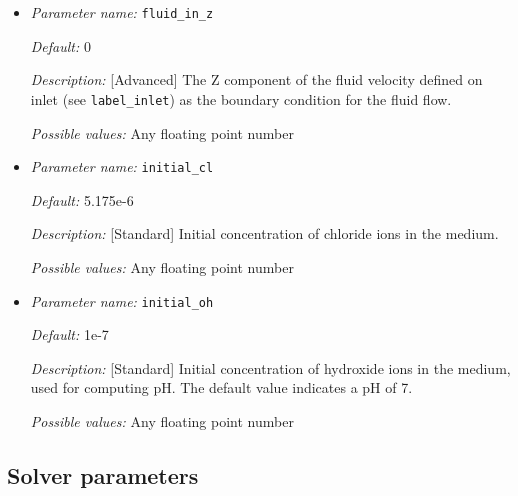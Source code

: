 \begin{itemize}

{\it Default:} 0

{\it Description:} [Advanced] The Y component of the fluid velocity defined on inlet (see {\tt label\_inlet}) as the boundary condition for the fluid flow.

{\it Possible values:} Any floating point number


\item {\it Parameter name:} {\tt fluid\_in\_z}
\label{parameters:fluid_in_z}


{\it Default:} 0

{\it Description:} [Advanced] The Z component of the fluid velocity defined on inlet (see {\tt label\_inlet}) as the boundary condition for the fluid flow.

{\it Possible values:} Any floating point number


\item {\it Parameter name:} {\tt initial\_cl}
\label{parameters:initial_cl}


{\it Default:} 5.175e-6

{\it Description:} [Standard] Initial concentration of chloride ions in the medium.

{\it Possible values:} Any floating point number


\item {\it Parameter name:} {\tt initial\_oh}
\label{parameters:initial_oh}


{\it Default:} 1e-7

{\it Description:} [Standard] Initial concentration of hydroxide ions in the medium, used for computing pH. The default value indicates a pH of 7.

{\it Possible values:} Any floating point number


\end{itemize}



\subsection{Solver parameters}
\label{parameters:sovler}

